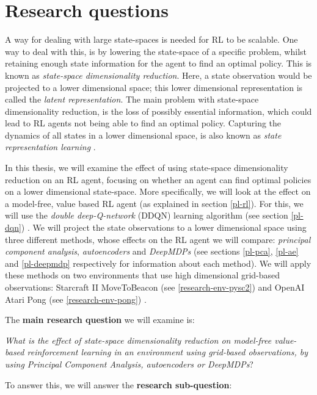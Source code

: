 \section{Research questions}
A way for dealing with large state-spaces is needed for RL to be scalable. One way to deal with this, is by lowering the state-space of a specific problem, whilst retaining enough state information for the agent to find an optimal policy. This is known as \emph{state-space dimensionality reduction}. Here, a state observation would be projected to a lower dimensional space; this lower dimensional representation is called the \emph{latent representation}. The main problem with state-space dimensionality reduction, is the loss of possibly essential information, which could lead to RL agents not being able to find an optimal policy. Capturing the dynamics of all states in a lower dimensional space, is also known as \emph{state representation learning} \cite{representation_overview}.

In this thesis, we will examine the effect of using state-space dimensionality reduction on an RL agent, focusing on whether an agent can find optimal policies on a lower dimensional state-space. More specifically, we will look at the effect on a model-free, value based RL agent (as explained in section \ref{pl-rl}). For this, we will use the \emph{double deep-Q-network} (DDQN) learning algorithm (see section \ref{pl-dqn}) \cite{ddqn}. We will project the state observations to a lower dimensional space using three different methods, whose effects on the RL agent we will compare: \emph{principal component analysis}, \emph{autoencoders} and \emph{DeepMDPs} (see sections \ref{pl-pca}, \ref{pl-ae} and \ref{pl-deepmdp} respectively for information about each method). We will apply these methods on two environments that use high dimensional grid-based observations: Starcraft II MoveToBeacon (see \ref{research-env-pysc2}) and OpenAI Atari Pong (see \ref{research-env-pong}) \cite{pysc2}\cite{pong}.

The \textbf{main research question} we will examine is:\newline

\noindent \textit{What is the effect of state-space dimensionality reduction on model-free value-based reinforcement learning in an environment using grid-based observations, by using Principal Component Analysis, autoencoders or DeepMDPs}? \newline

\noindent To answer this, we will answer the \textbf{research sub-question}:\newline

